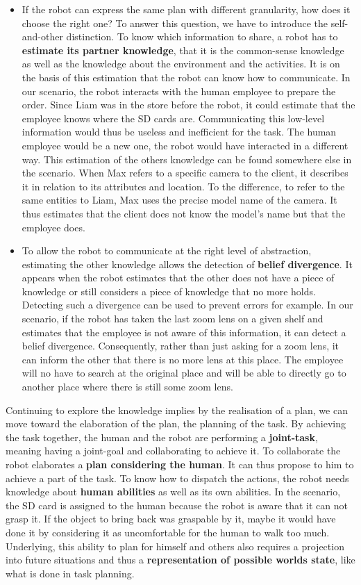 \begin{itemize}
  \item If the robot can express the same plan with different granularity, how does it choose the right one? To answer this question, we have to introduce the self-and-other distinction. To know which information to share, a robot has to \textbf{estimate its partner knowledge}, that it is the common-sense knowledge as well as the knowledge about the environment and the activities. It is on the basis of this estimation that the robot can know how to communicate. In our scenario, the robot interacts with the human employee to prepare the order. Since Liam was in the store before the robot, it could estimate that the employee knows where the SD cards are. Communicating this low-level information would thus be useless and inefficient for the task. The human employee would be a new one, the robot would have interacted in a different way. This estimation of the others knowledge can be found somewhere else in the scenario. When Max refers to a specific camera to the client, it describes it in relation to its attributes and location. To the difference, to refer to the same entities to Liam, Max uses the precise model name of the camera. It thus estimates that the client does not know the model's name but that the employee does.
  
  \item To allow the robot to communicate at the right level of abstraction, estimating the other knowledge allows the detection of \textbf{belief divergence}. It appears when the robot estimates that the other does not have a piece of knowledge or still considers a piece of knowledge that no more holds. Detecting such a divergence can be used to prevent errors for example. In our scenario, if the robot has taken the last zoom lens on a given shelf and estimates that the employee is not aware of this information, it can detect a belief divergence. Consequently, rather than just asking for a zoom lens, it can inform the other that there is no more lens at this place. The employee will no have to search at the original place and will be able to directly go to another place where there is still some zoom lens.
\end{itemize}

Continuing to explore the knowledge implies by the realisation of a plan, we can move toward the elaboration of the plan, the planning of the task. By achieving the task together, the human and the robot are performing a \textbf{joint-task}, meaning having a joint-goal and collaborating to achieve it. To collaborate the robot elaborates a \textbf{plan considering the human}. It can thus propose to him to achieve a part of the task. To know how to dispatch the actions, the robot needs knowledge about \textbf{human abilities} as well as its own abilities. In the scenario, the SD card is assigned to the human because the robot is aware that it can not grasp it. If the object to bring back was graspable by it, maybe it would have done it by considering it as uncomfortable for the human to walk too much. Underlying, this ability to plan for himself and others also requires a projection into future situations and thus a \textbf{representation of possible worlds state}, like what is done in task planning.

